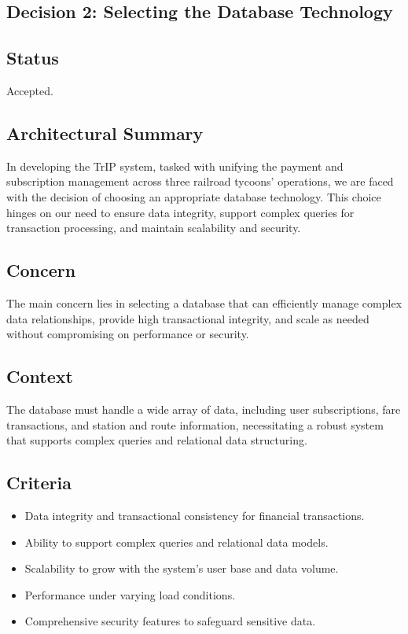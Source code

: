 \subsection{Decision 2: Selecting the Database Technology}

\subsection*{Status}
Accepted.

\subsection*{Architectural Summary}
In developing the TrIP system, tasked with unifying the payment and subscription management across three railroad tycoons' operations, we are faced with the decision of choosing an appropriate database technology. This choice hinges on our need to ensure data integrity, support complex queries for transaction processing, and maintain scalability and security.

\subsection*{Concern}
The main concern lies in selecting a database that can efficiently manage complex data relationships, provide high transactional integrity, and scale as needed without compromising on performance or security.

\subsection*{Context}
The database must handle a wide array of data, including user subscriptions, fare transactions, and station and route information, necessitating a robust system that supports complex queries and relational data structuring.

\subsection*{Criteria}
\begin{itemize}
    \item Data integrity and transactional consistency for financial transactions.
    \item Ability to support complex queries and relational data models.
    \item Scalability to grow with the system's user base and data volume.
    \item Performance under varying load conditions.
    \item Comprehensive security features to safeguard sensitive data.
\end{itemize}


